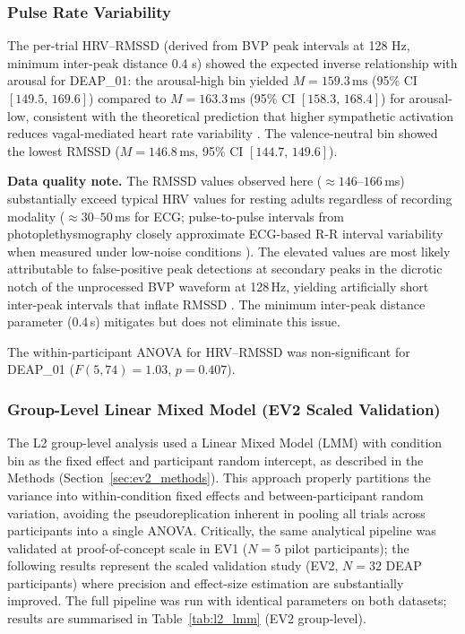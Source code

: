 \subsubsection{Pulse Rate Variability}

The per-trial \gls{HRV}--\gls{RMSSD} (derived from BVP peak intervals at 128 Hz, minimum inter-peak distance 0.4 s) showed the expected inverse relationship with arousal for DEAP\_01: the arousal-high bin yielded $M = 159.3\,\text{ms}$ (95\% CI $[149.5,\, 169.6]$) compared to $M = 163.3\,\text{ms}$ (95\% CI $[158.3,\, 168.4]$) for arousal-low, consistent with the theoretical prediction that higher sympathetic activation reduces vagal-mediated heart rate variability \parencite{malikHeartRateVariability1996, shafferOverviewHeartRate2017}. The valence-neutral bin showed the lowest \gls{RMSSD} ($M = 146.8\,\text{ms}$, 95\% CI $[144.7,\, 149.6]$).

\noindent\textbf{Data quality note.} The \gls{RMSSD} values observed here ($\approx 146$--$166$\,ms) substantially exceed typical \gls{HRV} values for resting adults regardless of recording modality ($\approx 30$--$50$\,ms for ECG; pulse-to-pulse intervals from photoplethysmography closely approximate ECG-based R-R interval variability when measured under low-noise conditions \parencite{allenPhotoplethysmographyItsApplication2007}). The elevated values are most likely attributable to false-positive peak detections at secondary peaks in the dicrotic notch of the unprocessed BVP waveform at 128\,Hz, yielding artificially short inter-peak intervals that inflate \gls{RMSSD} \parencite{pengrosaPioneerPhysiologicalOptics2024}. The minimum inter-peak distance parameter (0.4\,s) mitigates but does not eliminate this issue.

The within-participant \gls{ANOVA} for \gls{HRV}--\gls{RMSSD} was non-significant for DEAP\_01 ($F(5, 74) = 1.03$, $p = 0.407$).

\subsubsection{Group-Level Linear Mixed Model (EV2 Scaled Validation)}

The L2 group-level analysis used a Linear Mixed Model (LMM) with condition bin as the fixed effect and participant random intercept, as described in the Methods (Section~\ref{sec:ev2_methods}). This approach properly partitions the variance into within-condition fixed effects and between-participant random variation, avoiding the pseudoreplication inherent in pooling all trials across participants into a single ANOVA. Critically, the same analytical pipeline was validated at proof-of-concept scale in EV1 ($N=5$ pilot participants); the following results represent the scaled validation study (EV2, $N=32$ DEAP participants) where precision and effect-size estimation are substantially improved. The full pipeline was run with identical parameters on both datasets; results are summarised in Table~\ref{tab:l2_lmm} (EV2 group-level).

